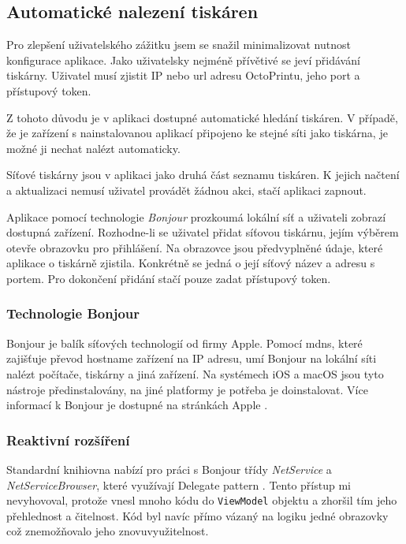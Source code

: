\subsection{Automatické nalezení tiskáren}

Pro zlepšení uživatelského zážitku jsem se snažil minimalizovat nutnost konfigurace aplikace.
Jako uživatelsky nejméně přívětivé se jeví přidávání tiskárny.
Uživatel musí zjistit IP nebo \acrshort{url} adresu OctoPrintu, jeho port a přístupový token.

Z tohoto důvodu je v aplikaci dostupné automatické hledání tiskáren.
V případě, že je zařízení s nainstalovanou aplikací připojeno ke stejné síti jako tiskárna, je možné ji nechat nalézt automaticky.

Síťové tiskárny jsou v aplikaci jako druhá část seznamu tiskáren.
K jejich načtení a aktualizaci nemusí uživatel provádět žádnou akci, stačí aplikaci zapnout.

Aplikace pomocí technologie \textit{Bonjour} prozkoumá lokální síť a uživateli zobrazí dostupná zařízení.
Rozhodne-li se uživatel přidat síťovou tiskárnu, jejím výběrem otevře obrazovku pro přihlášení.
Na obrazovce jsou předvyplněné údaje, které aplikace o tiskárně zjistila.
Konkrétně se jedná o její síťový název a adresu s portem.
Pro dokončení přidání stačí pouze zadat přístupový token.

\subsubsection*{Technologie Bonjour}

Bonjour je balík síťových technologií od firmy Apple.
Pomocí \acrfull{mdns}, které zajišťuje převod hostname zařízení na IP adresu, umí Bonjour na lokální síti nalézt počítače, tiskárny a jiná zařízení.
Na systémech iOS a macOS jsou tyto nástroje předinstalovány, na jiné platformy je potřeba je doinstalovat.
Více informací k Bonjour je dostupné na stránkách Apple \cite{apple-bonjour}.

\subsubsection*{Reaktivní rozšíření}

Standardní knihiovna nabízí pro práci s Bonjour třídy \textit{NetService} a \textit{NetServiceBrowser}, které využívají Delegate pattern \cite{apple-netservicebrowser}.
Tento přístup mi nevyhovoval, protože vnesl mnoho kódu do \texttt{ViewModel} objektu a zhoršil tím jeho přehlednost a čitelnost.
Kód byl navíc přímo vázaný na logiku jedné obrazovky což znemožňovalo jeho znovuvyužitelnost.

